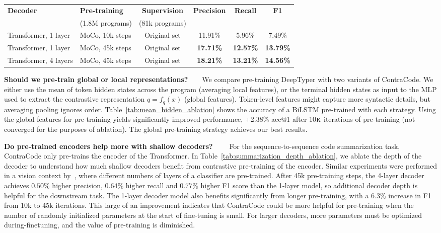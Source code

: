 \documentclass[11pt]{article}
\newcommand{\thou}[0]{$\textsc{k}$}
\newcommand{\ours}[0]{ContraCode}
\begin{document}
\begin{table*}
\caption{Training time and decoder depth ablation on the method name prediction task. Longer pre-training significantly improves downstream performance when a shallow, 1 layer decoder is used.} 
\label{tab:summarization_depth_ablation}
\footnotesize
\centering
\begin{tabular}{llcccc} \hline
    \multirow{2}{*}{\textbf{Decoder}} & \textbf{Pre-training} & \textbf{Supervision} & \multirow{2}{*}{\textbf{Precision}} & \multirow{2}{*}{\textbf{Recall}} & \multirow{2}{*}{\textbf{F1}}\\
    & (1.8M programs) & (81k programs) & \\
    \hline
    Transformer, 1 layer & MoCo, 10k steps & Original set & 11.91\% & 5.96\% & 7.49\%\\
    Transformer, 1 layer & MoCo, 45k steps & Original set & \textbf{17.71\%} & \textbf{12.57\%} & \textbf{13.79\%}\\
    Transformer, 4 layers & MoCo, 45k steps & Original set & \textbf{18.21\%} & \textbf{13.21\%} & \textbf{14.56\%} \\
     \hline 
\end{tabular}
\end{table*}


\textbf{Should we pre-train global or local representations?}~~~~We compare pre-training DeepTyper with two variants of \ours{}. We either use the mean of token hidden states across the program (averaging local features), or the terminal hidden states as input to the MLP used to extract the contrastive representation $q=f_q(x)$ (global features). Token-level features might capture more syntactic details, but averaging pooling ignores order. Table~\ref{tab:mean_hidden_ablation} shows the accuracy of a BiLSTM pre-trained with each strategy. Using the global features for pre-training yields significantly improved performance, +2.38\% acc@1 after 10\thou{} iterations of pre-training (not converged for the purposes of ablation). The global pre-training strategy achieves our best results.

\textbf{Do pre-trained encoders help more with shallow decoders?}~~~~
For the sequence-to-sequence code summarization task, \ours{} only pre-trains the encoder of the Transformer. In Table~\ref{tab:summarization_depth_ablation}, we ablate the depth of the decoder to understand how much shallow decoders benefit from contrastive pre-training of the encoder. Similar experiments were performed in a vision context by~\cite{erhan2010does}, where different numbers of layers of a classifier are pre-trained. After 45k pre-training steps, the 4-layer decoder achieves $0.50\%$ higher precision, $0.64\%$ higher recall and $0.77\%$ higher F1 score than the 1-layer model, so additional decoder depth is helpful for the downstream task. The 1-layer decoder model also benefits significantly from longer pre-training, with a $6.3\%$ increase in F1 from 10k to 45k iterations. This large of an improvement indicates that \ours{} could be more helpful for pre-training when the number of randomly initialized parameters at the start of fine-tuning is small. For larger decoders, more parameters must be optimized during-finetuning, and the value of pre-training is diminished.
\end{document}
